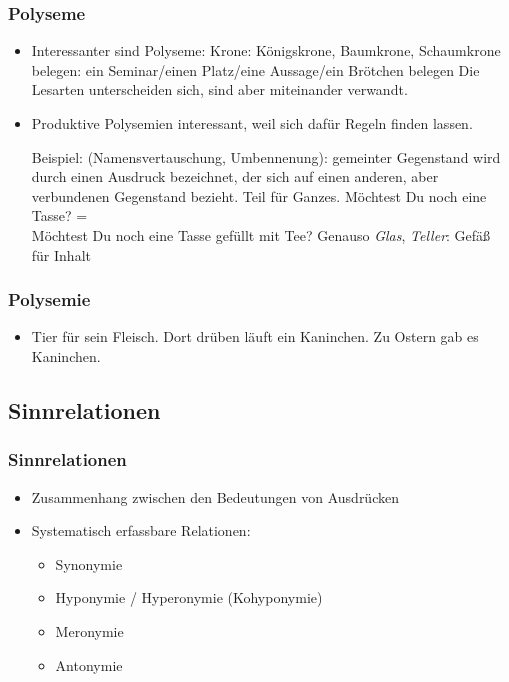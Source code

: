 \begin{frame}
\frametitle{Polyseme}
  \begin{itemize}
  \item Interessanter sind Polyseme:
\eal
\ex Krone: Königskrone, Baumkrone, Schaumkrone
\ex belegen: ein Seminar/einen Platz/eine Aussage/ein Brötchen belegen
\zl
Die Lesarten unterscheiden sich, sind aber miteinander verwandt.

\pause
\item Produktive Polysemien interessant, weil sich dafür Regeln finden lassen.

%
Beispiel:  (Namensvertauschung, Umbennenung): gemeinter Gegenstand wird durch einen Ausdruck bezeichnet, der sich
auf einen anderen, aber verbundenen Gegenstand bezieht. \zb Teil für Ganzes.
\ea
Möchtest Du noch eine Tasse? = \\Möchtest Du noch eine Tasse gefüllt mit Tee?
\z
Genauso \emph{Glas}, \emph{Teller}: Gefäß für Inhalt

  \end{itemize}
\end{frame}

\begin{frame}
\frametitle{Polysemie}
  \begin{itemize}
  \item Tier für sein Fleisch.
\eal
\ex Dort drüben läuft ein Kaninchen. 
\ex Zu Ostern gab es Kaninchen.
\zl
  \end{itemize}
\end{frame}




%
\subsection{Sinnrelationen}
%

\begin{frame}
\frametitle{Sinnrelationen}

\begin{itemize}
	\item Zusammenhang zwischen den Bedeutungen von Ausdrücken
	\item Systematisch erfassbare Relationen:
	
\vspace{5mm}
	
	\begin{itemize}
		\item Synonymie
		\item Hyponymie / Hyperonymie (Kohyponymie)
		\item Meronymie
 		\item Antonymie
	\end{itemize}
	
\end{itemize}

\end{frame}


